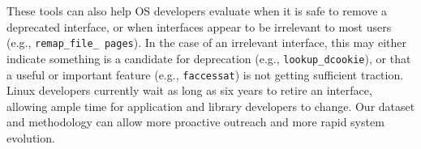 These tools can also help OS developers evaluate when it is safe to remove a deprecated interface,
or when interfaces appear to be irrelevant to most users (e.g., {\tt remap\_file\_ pages}).
In the case of an irrelevant interface, this may either indicate something is a candidate for deprecation (e.g., {\tt lookup\_dcookie}),
or that a useful or important feature (e.g., {\tt faccessat}) is not getting sufficient traction.
Linux developers currently wait as long as 
six years to retire an interface, allowing ample time for application and library developers to change.
Our dataset and methodology can allow more proactive outreach and more rapid system evolution.



